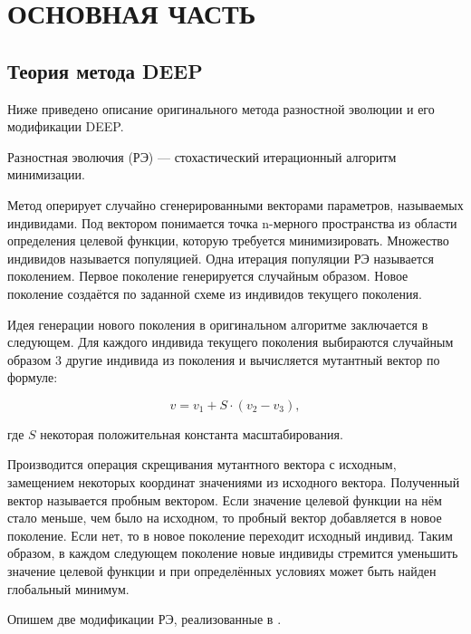 \setcounter{figure}{0} \setcounter{table}{0} \setcounter{equation}{0}
\chapter*{ОСНОВНАЯ ЧАСТЬ}

\section*{Теория метода DEEP}

Ниже приведено описание оригинального метода разностной эволюции
и его модификации DEEP.

Разностная эволючия (РЭ) ---
стохастический итерационный алгоритм минимизации.

Метод оперирует случайно сгенерированными векторами параметров,
называемых индивидами. 
Под вектором понимается точка n-мерного пространства
из области определения целевой функции,
которую требуется минимизировать.
Множество индивидов называется популяцией.
Одна итерация популяции РЭ называется поколением.
Первое поколение генерируется случайным образом.
Новое поколение создаётся
по заданной схеме из индивидов текущего поколения.

Идея генерации нового поколения в оригинальном алгоритме
заключается в следующем.
Для каждого индивида текущего поколения
выбираются случайным образом 3 другие индивида
из поколения и вычисляется мутантный вектор по формуле:

\begin{equation} \label{mutant}
    v = v_1 + S \cdot (v_2 - v_3),
\end{equation}

где \begin{math}S\end{math} некоторая положительная константа масштабирования.

Производится операция скрещивания мутантного вектора с исходным,
замещением некоторых координат значениями из исходного вектора.
Полученный вектор называется пробным вектором.
Если значение целевой функции на нём стало меньше,
чем было на исходном, то пробный вектор добавляется в новое поколение.
Если нет, то в новое поколение переходит исходный индивид.
Таким образом, в каждом следующем поколение новые индивиды
стремится уменьшить значение целевой функции
и при определённых условиях может быть найден глобальный минимум.

Опишем две модификации РЭ, реализованные в \cite{KozlovThesis}.

